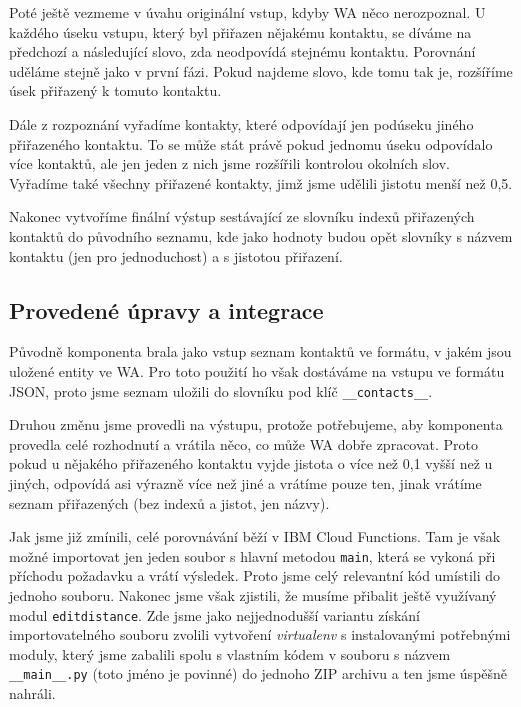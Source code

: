 Poté ještě vezmeme v úvahu originální vstup, kdyby WA něco nerozpoznal. U každého
úseku vstupu, který byl přiřazen nějakému kontaktu, se díváme na předchozí a následující
slovo, zda neodpovídá stejnému kontaktu. Porovnání uděláme stejně jako v první fázi.
Pokud najdeme slovo, kde tomu tak je, rozšíříme úsek přiřazený k tomuto kontaktu.

Dále z rozpoznání vyřadíme kontakty, které odpovídají jen podúseku jiného
přiřazeného kontaktu. To se může stát právě pokud jednomu úseku odpovídalo více
kontaktů, ale jen jeden z nich jsme rozšířili kontrolou okolních slov. Vyřadíme také
všechny přiřazené kontakty, jimž jsme udělili jistotu menší než 0,5.

Nakonec vytvoříme finální výstup sestávající ze slovníku indexů přiřazených kontaktů
do původního seznamu, kde jako hodnoty budou opět slovníky s názvem kontaktu (jen pro
jednoduchost) a s jistotou přiřazení.

\subsection{Provedené úpravy a integrace}

Původně komponenta brala jako vstup seznam kontaktů ve formátu, v jakém jsou uložené
entity ve WA. Pro toto použití ho však dostáváme na vstupu ve formátu JSON, proto
jsme seznam uložili do slovníku pod klíč \texttt{\_\_contacts\_\_}.

Druhou změnu jsme provedli na výstupu, protože potřebujeme, aby komponenta provedla
celé rozhodnutí a vrátila něco, co může WA dobře zpracovat. Proto pokud u nějakého
přiřazeného kontaktu vyjde jistota o více než 0,1 vyšší než u jiných, odpovídá asi
výrazně více než jiné a vrátíme pouze
ten, jinak vrátíme seznam přiřazených (bez indexů a jistot, jen názvy).

Jak jsme již zmínili, celé porovnávání běží v IBM Cloud Functions. Tam je však možné
importovat jen jeden soubor s hlavní metodou \texttt{main}, která se vykoná při
příchodu požadavku a vrátí výsledek. Proto jsme celý relevantní kód umístili do
jednoho souboru. Nakonec jsme však zjistili, že musíme přibalit ještě využívaný
modul \texttt{editdistance}. Zde jsme jako nejjednodušší variantu získání importovatelného souboru
zvolili vytvoření \textit{virtualenv} s instalovanými potřebnými moduly,
který jsme zabalili spolu s vlastním kódem v souboru s názvem \texttt{\_\_main\_\_.py}
(toto jméno je povinné) do jednoho ZIP archivu a ten jsme úspěšně nahráli.